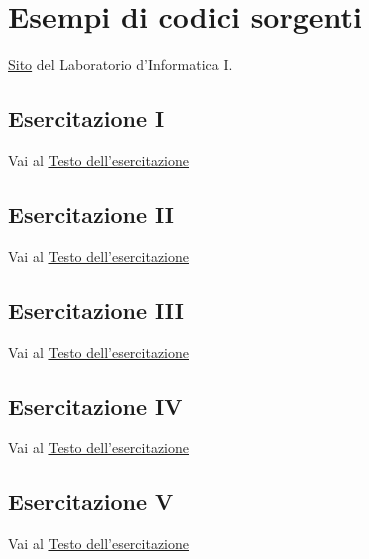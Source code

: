 \chapter{Esempi di codici sorgenti}
\href{http://www.mc3.disco.unimib.it/lif/}{Sito} del Laboratorio d'Informatica I.
	\section{Esercitazione I}
Vai al \href{http://www.mc3.disco.unimib.it/lif/Dep/eslab1.pdf}{Testo dell'esercitazione}
		
		

	\section{Esercitazione II}
Vai al \href{http://www.mc3.disco.unimib.it/lif/Dep/eslab2.pdf}{Testo dell'esercitazione}
		
		

	\section{Esercitazione III}	
Vai al \href{http://www.mc3.disco.unimib.it/lif/Dep/eslab3.pdf}{Testo dell'esercitazione}
		
		
		
		

	\section{Esercitazione IV}
Vai al \href{http://www.mc3.disco.unimib.it/lif/Dep/eslab4.pdf}{Testo dell'esercitazione}
		
		
		
			

	\section{Esercitazione V}
Vai al \href{http://www.mc3.disco.unimib.it/lif/Dep/eslab5.pdf}{Testo dell'esercitazione}
		
		
		

